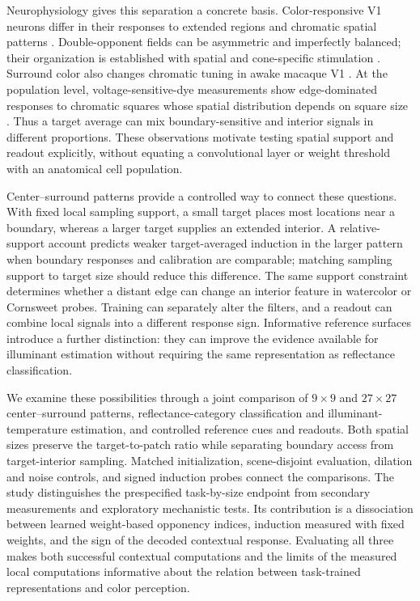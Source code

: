 \documentclass[authoryear,preprint,review,12pt]{elsarticle}
\begin{document}
Neurophysiology gives this separation a concrete basis. Color-responsive V1 neurons differ in their responses to extended regions and chromatic spatial patterns \citep{johnson2008orientation,conway2006spatiotemporal}. Double-opponent fields can be asymmetric and imperfectly balanced; their organization is established with spatial and cone-specific stimulation \citep{de2021spatial,de2022coding}. Surround color also changes chromatic tuning in awake macaque V1 \citep{wachtler2003}. At the population level, voltage-sensitive-dye measurements show edge-dominated responses to chromatic squares whose spatial distribution depends on square size \citep{zweig2015surfaces}. Thus a target average can mix boundary-sensitive and interior signals in different proportions. These observations motivate testing spatial support and readout explicitly, without equating a convolutional layer or weight threshold with an anatomical cell population.

Center--surround patterns provide a controlled way to connect these questions. With fixed local sampling support, a small target places most locations near a boundary, whereas a larger target supplies an extended interior. A relative-support account predicts weaker target-averaged induction in the larger pattern when boundary responses and calibration are comparable; matching sampling support to target size should reduce this difference. The same support constraint determines whether a distant edge can change an interior feature in watercolor or Cornsweet probes. Training can separately alter the filters, and a readout can combine local signals into a different response sign. Informative reference surfaces introduce a further distinction: they can improve the evidence available for illuminant estimation without requiring the same representation as reflectance classification.

We examine these possibilities through a joint comparison of $9\times9$ and $27\times27$ center--surround patterns, reflectance-category classification and illuminant-temperature estimation, and controlled reference cues and readouts. Both spatial sizes preserve the target-to-patch ratio while separating boundary access from target-interior sampling. Matched initialization, scene-disjoint evaluation, dilation and noise controls, and signed induction probes connect the comparisons. The study distinguishes the prespecified task-by-size endpoint from secondary measurements and exploratory mechanistic tests. Its contribution is a dissociation between learned weight-based opponency indices, induction measured with fixed weights, and the sign of the decoded contextual response. Evaluating all three makes both successful contextual computations and the limits of the measured local computations informative about the relation between task-trained representations and color perception.
\end{document}
